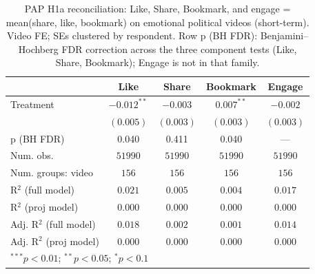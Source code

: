 
\begin{table}
\begin{center}
\begin{tabular}{l c c c c}
\hline
 & Like & Share & Bookmark & Engage \\
\hline
Treatment               & $-0.012^{**}$ & $-0.003$  & $0.007^{**}$ & $-0.002$  \\
                        & $(0.005)$     & $(0.003)$ & $(0.003)$    & $(0.003)$ \\
\hline
p (BH FDR)              & 0.040         & 0.411     & 0.040        & ---       \\
Num. obs.               & $51990$       & $51990$   & $51990$      & $51990$   \\
Num. groups: video      & $156$         & $156$     & $156$        & $156$     \\
R$^2$ (full model)      & $0.021$       & $0.005$   & $0.004$      & $0.017$   \\
R$^2$ (proj model)      & $0.000$       & $0.000$   & $0.000$      & $0.000$   \\
Adj. R$^2$ (full model) & $0.018$       & $0.002$   & $0.001$      & $0.014$   \\
Adj. R$^2$ (proj model) & $0.000$       & $0.000$   & $0.000$      & $0.000$   \\
\hline
\multicolumn{5}{l}{\scriptsize{$^{***}p<0.01$; $^{**}p<0.05$; $^{*}p<0.1$}}
\end{tabular}
\caption{PAP H1a reconciliation: Like, Share, Bookmark, and engage = mean(share, like, bookmark) on emotional political videos (short-term). Video FE; SEs clustered by respondent. Row p (BH FDR): Benjamini--Hochberg FDR correction across the three component tests (Like, Share, Bookmark); Engage is not in that family.}
\label{tab:pap_h1a_engage_emotional}
\end{center}
\end{table}
